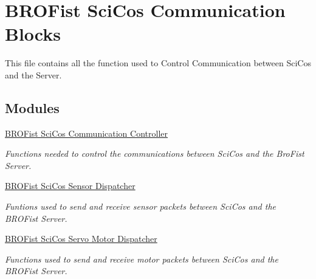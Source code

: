 \hypertarget{group___b_r_o_cos_comm}{
\section{BROFist SciCos Communication Blocks}
\label{group___b_r_o_cos_comm}
}


This file contains all the function used to Control Communication between SciCos and the Server.  


\subsection*{Modules}
\begin{DoxyCompactItemize}
\item 
\hyperlink{group___b_r_o_cos_comm_contr}{BROFist SciCos Communication Controller}


\begin{DoxyCompactList}\small\item\em Functions needed to control the communications between SciCos and the BroFist Server. \item\end{DoxyCompactList}

\item 
\hyperlink{group___b_r_o_cos_sens_dispatcher}{BROFist SciCos Sensor Dispatcher}


\begin{DoxyCompactList}\small\item\em Funtions used to send and receive sensor packets between SciCos and the BROFist Server. \item\end{DoxyCompactList}

\item 
\hyperlink{group___b_r_o_cos_mot_dispatcher}{BROFist SciCos Servo Motor Dispatcher}


\begin{DoxyCompactList}\small\item\em Functions used to send and receive motor packets between SciCos and the BROFist Server. \item\end{DoxyCompactList}

\end{DoxyCompactItemize}


